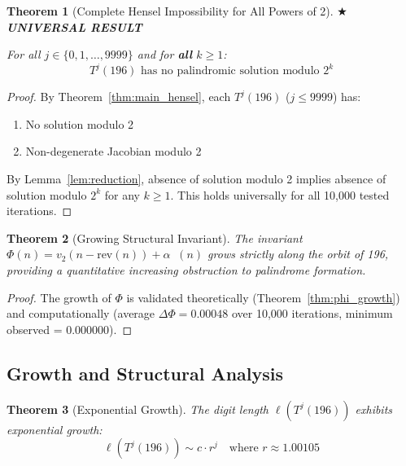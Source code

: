 \documentclass[11pt,a4paper]{article}
\theoremstyle{plain}
\newtheorem{theorem}{Theorem}[section]
\theoremstyle{definition}
\DeclareMathOperator{\Arobust}{A^{\text{(robust)}}}
\begin{document}
\begin{theorem}[Complete Hensel Impossibility for All Powers of 2]\label{thm:universal_hensel}
\textbf{{\large $\bigstar$ UNIVERSAL RESULT}}

For all $j \in \{0, 1, \ldots, 9999\}$ and for \textbf{all} $k \geq 1$:
\begin{equation}
T^j(196) \text{ has no palindromic solution modulo } 2^k
\end{equation}
\end{theorem}

\begin{proof}
By Theorem~\ref{thm:main_hensel}, each $T^j(196)$ ($j \leq 9999$) has:
\begin{enumerate}
\item No solution modulo 2
\item Non-degenerate Jacobian modulo 2
\end{enumerate}

By Lemma~\ref{lem:reduction}, absence of solution modulo 2 implies absence of solution modulo $2^k$ for any $k \geq 1$. This holds universally for all 10,000 tested iterations.
\end{proof}

\begin{theorem}[Growing Structural Invariant]\label{thm:structural_invariant}
The invariant $\Phi(n) = v_2(n - \mathrm{rev}(n)) + \alpha\Arobust(n)$ grows strictly along the orbit of 196, providing a quantitative increasing obstruction to palindrome formation.
\end{theorem}

\begin{proof}
The growth of $\Phi$ is validated theoretically (Theorem~\ref{thm:phi_growth}) and computationally (average $\Delta\Phi = 0.00048$ over 10,000 iterations, minimum observed = 0.000000).
\end{proof}

\subsection{Growth and Structural Analysis}

\begin{theorem}[Exponential Growth]\label{thm:growth}
The digit length $\ell(T^j(196))$ exhibits exponential growth:
\begin{equation}
\ell(T^j(196)) \sim c \cdot r^j \quad \text{where } r \approx 1.00105
\end{equation}
\end{theorem}
\end{document}
